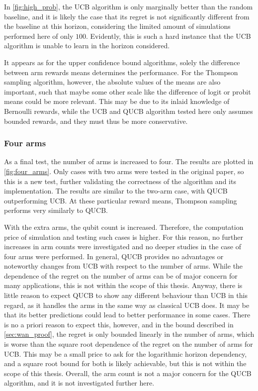 In \cref{fig:high_prob}, the UCB algorithm is only marginally better than the random baseline, and it is likely the case that its regret is not significantly different from the baseline at this horizon, considering the limited amount of simulations performed here of only $100$.
Evidently, this is such a hard instance that the UCB algorithm is unable to learn in the horizon considered.

It appears as for the upper confidence bound algorithms, solely the difference between arm rewards means determines the performance.
For the Thompson sampling algorithm, however, the absolute values of the means are also important, such that maybe some other scale like the difference of logit or probit means could be more relevant.
This may be due to its inlaid knowledge of Bernoulli rewards, while the UCB and QUCB algorithm tested here only assumes bounded rewards, and they must thus be more conservative.

\pagebreak\clearpage

\vspace*{0cm}
\subsubsection{Four arms}
As a final test, the number of arms is increased to four.
The results are plotted in \cref{fig:four_arms}.
Only cases with two arms were tested in the original paper, so this is a new test, further validating the correctness of the algorithm and its implementation.
The results are similar to the two-arm case, with QUCB outperforming UCB.
At these particular reward means, Thompson sampling performs very similarly to QUCB.


With the extra arms, the qubit count is increased.
Therefore, the computation price of simulation and testing such cases is higher.
For this reason, no further increases in arm counts were investigated and no deeper studies in the case of four arms were performed.
In general, QUCB provides no advantages or noteworthy changes from UCB with respect to the number of arms.
While the dependence of the regret on the number of arms can be of major concern for many applications, this is not within the scope of this thesis.
Anyway, there is little reason to expect QUCB to show any different behaviour than UCB in this regard, as it handles the arms in the same way as classical UCB does.
It may be that its better predictions could lead to better performance in some cases.
There is no a priori reason to expect this, however, and in the bound described in \cref{sec:wan_proof}, the regret is only bounded linearly in the number of arms, which is worse than the square root dependence of the regret on the number of arms for UCB.
This may be a small price to ask for the logarithmic horizon dependency, and a square root bound for both is likely achievable, but this is not within the scope of this thesis.
Overall, the arm count is not a major concern for the QUCB algorithm, and it is not investigated further here.

